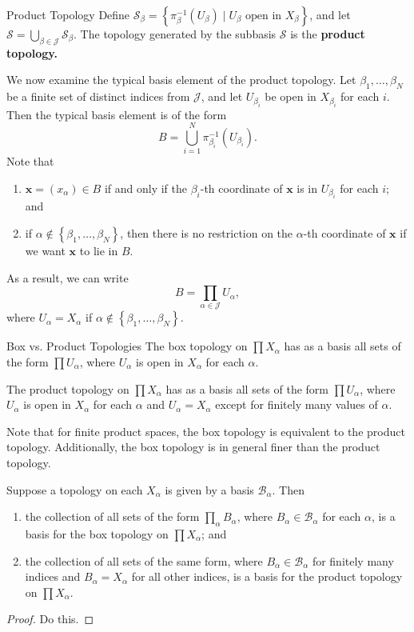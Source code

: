 \documentclass[10pt]{report}
\begin{document}
\begin{defn}{Product Topology}{}
	Define $\mathcal{S}_{\beta} = \left\{ \pi_{\beta}^{-1}(U_{\beta}) \;|\; U_{\beta} \text{ open in } X_{\beta} \right\}$, and let $\mathcal{S} = \bigcup_{\beta\in\mathcal{J}} \mathcal{S}_{\beta}$. The topology generated by the subbasis $\mathcal{S}$ is the \textbf{product topology.} 
\end{defn}

We now examine the typical basis element of the product topology. Let $\beta_1, \dots, \beta_N$ be a finite set of distinct indices from $\mathcal{J}$, and let $U_{\beta_i}$ be open in $X_{\beta_i}$ for each $i$. Then the typical basis element is of the form
\[
	B = \bigcup_{i=1}^N \pi_{\beta_i}^{-1}(U_{\beta_i}).
\] Note that
\begin{enumerate}
	\item $\mathbf{x}=(x_{\alpha}) \in B$ if and only if the $\beta_i$-th coordinate of $\mathbf{x}$ is in $U_{\beta_i}$ for each $i$; and
	\item if $\alpha \not\in \left\{ \beta_1, \dots, \beta_N \right\}$, then there is no restriction on the $\alpha$-th coordinate of $\mathbf{x}$ if we want $\mathbf{x}$ to lie in $B$.
\end{enumerate}
As a result, we can write
\[
B = \prod_{\alpha\in\mathcal{J}}U_{\alpha},
\] where $U_{\alpha}=X_{\alpha}$ if $\alpha \not\in \left\{ \beta_1, \dots, \beta_N \right\}$.

\begin{note}{Box vs. Product Topologies}{}
The box topology on $\prod X_{\alpha}$ has as a basis all sets of the form $\prod U_{\alpha}$, where $U_{\alpha}$ is open in $X_{\alpha}$ for each $\alpha$.

The product topology on $\prod X_{\alpha}$ has as a basis all sets of the form $\prod U_{\alpha}$, where $U_{\alpha}$ is open in $X_{\alpha}$ for each $\alpha$ and $U_{\alpha}=X_{\alpha}$ except for finitely many values of $\alpha$.
\end{note}

Note that for finite product spaces, the box topology is equivalent to the product topology. Additionally, the box topology is in general finer than the product topology.

\begin{thrm}{}{}
Suppose a topology on each $X_{\alpha}$ is given by a basis $\mathcal{B}_{\alpha}$. Then
\begin{enumerate}
	\item the collection of all sets of the form $\prod_{\alpha}B_{\alpha}$, where $B_{\alpha}\in \mathcal{B}_{\alpha}$ for each $\alpha$, is a basis for the box topology on $\prod X_{\alpha}$; and
	\item the collection of all sets of the same form, where $B_{\alpha}\in \mathcal{B}_{\alpha}$ for finitely many indices and $B_{\alpha}=X_{\alpha}$ for all other indices, is a basis for the product topology on $\prod X_{\alpha}$.
\end{enumerate}
\end{thrm}
\begin{proof}
{\color{red}Do this.}
\end{proof}
\end{document}
